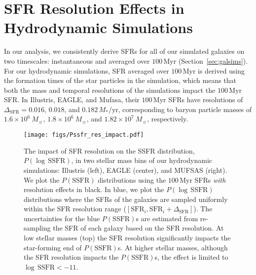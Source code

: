 \documentclass[preprint2,tighten]{aastex62}
\begin{document}

\section{SFR Resolution Effects in Hydrodynamic Simulations} \label{app:zerosfr}
In our analysis, we consistently derive SFRs for all of our simulated
galaxies on two timescales: instantaneous and averaged over 
$100\,\mathrm{Myr}$ (Section~\ref{sec:galsims}). For our hydrodynamic 
simulations, SFR averaged over $100\,\mathrm{Myr}$ is derived using 
the formation times of the star particles in the simulation, which 
means that both the mass and temporal resolutions of the simulations 
impact the $100\,\mathrm{Myr}$ SFR. In Illustris, EAGLE, and {\sc Mufasa},
their $100\,\mathrm{Myr}$ SFRs have resolutions of 
$\Delta_\mathrm{SFR} = 0.016$, $0.018$, and $0.182\,M_*/\mathrm{yr}$, 
corresponding to baryon particle masses of $1.6 \times 10^6\ M_{\sun}$, 
$1.8 \times 10^6\ M_{\sun}$, and $1.82 \times 10^7\ M_{\sun}$, respectively. 

\begin{figure*}
\begin{center}
\texttt{[image: figs/Pssfr\_res\_impact.pdf]} 
\caption{The impact of SFR resolution on the SSFR distribution, 
$P(\log\,\mathrm{SSFR})$, in two stellar mass bins of our hydrodynamic 
simulations:
Illustris (left), EAGLE (center), and MUFSAS (right). We plot the 
$P(\mathrm{SSFR})$ distributions using the $100\,\mathrm{Myr}$
SFRs \emph{with} resolution effects in black. In blue, we plot the 
$P(\log\,\mathrm{SSFR})$ distributions where the SFRs of the galaxies
are sampled uniformly within the SFR resolution range 
($[\mathrm{SFR}_i, \mathrm{SFR}_i+\Delta_\mathrm{SFR}]$). The 
uncertainties for the blue $P(\mathrm{SSFR})$s are estimated from 
re-sampling the SFR of each galaxy based on the SFR resolution. 
At low stellar masses (top) the SFR resolution significantly impacts 
the star-forming end of $P(\mathrm{SSFR})$s. At higher stellar masses, 
although the SFR resolution impacts the $P(\mathrm{SSFR})$s, the effect 
is limited to $\log\,\mathrm{SSFR} < -11$.
} 
\label{fig:sfrres_pssfr}
\end{center}
\end{figure*}
\end{document}

